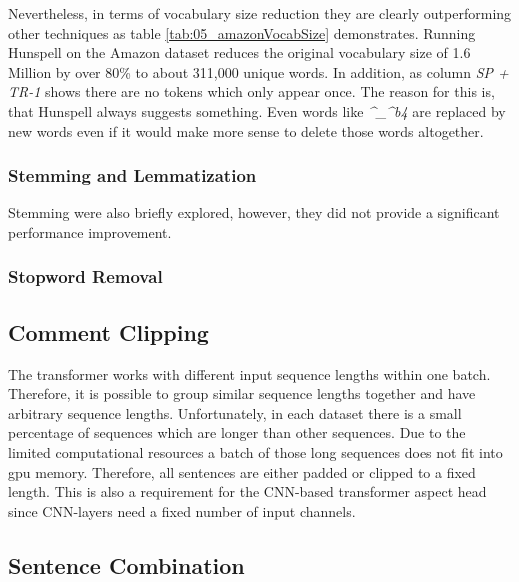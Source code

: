 Nevertheless, in terms of vocabulary size reduction they are clearly outperforming other techniques as table \ref{tab:05_amazonVocabSize} demonstrates. Running Hunspell on the Amazon dataset reduces the original vocabulary size of 1.6 Million by over 80\% to about 311,000 unique words. In addition, as column \textit{SP + TR-1} shows there are no tokens which only appear once. The reason for this is, that Hunspell always suggests something. Even words like \textit{\^{}\_\^{}b4} are replaced by new words even if it would make more sense to delete those words altogether.


\subsubsection*{Stemming and Lemmatization}

Stemming were also briefly explored, however, they did not provide a significant performance improvement.

\subsubsection*{Stopword Removal}


\subsection{Comment Clipping}
\label{subsec:06_CommentClipping}


The transformer works with different input sequence lengths within one batch. Therefore, it is possible to group similar sequence lengths together and have arbitrary sequence lengths. Unfortunately, in each dataset there is a small percentage of sequences which are longer than other sequences. Due to the limited computational resources a batch of those long sequences  does not fit into \gls{gpu} memory. Therefore, all sentences are either padded or clipped to a fixed length. This is also a requirement for the CNN-based transformer aspect head since CNN-layers need a fixed number of input channels.

\subsection{Sentence Combination}


